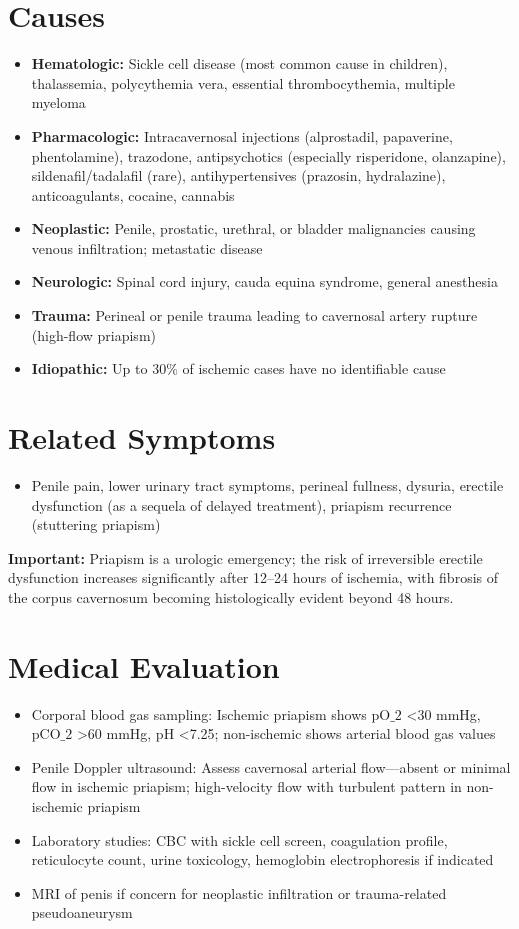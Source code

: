 \section*{Causes}
\begin{itemize}
  \item \textbf{Hematologic:} Sickle cell disease (most common cause in children), thalassemia, polycythemia vera, essential thrombocythemia, multiple myeloma
  \item \textbf{Pharmacologic:} Intracavernosal injections (alprostadil, papaverine, phentolamine), trazodone, antipsychotics (especially risperidone, olanzapine), sildenafil/tadalafil (rare), antihypertensives (prazosin, hydralazine), anticoagulants, cocaine, cannabis
  \item \textbf{Neoplastic:} Penile, prostatic, urethral, or bladder malignancies causing venous infiltration; metastatic disease
  \item \textbf{Neurologic:} Spinal cord injury, cauda equina syndrome, general anesthesia
  \item \textbf{Trauma:} Perineal or penile trauma leading to cavernosal artery rupture (high-flow priapism)
  \item \textbf{Idiopathic:} Up to 30\% of ischemic cases have no identifiable cause
\end{itemize}

\section*{Related Symptoms}
\begin{itemize}
  \item Penile pain, lower urinary tract symptoms, perineal fullness, dysuria, erectile dysfunction (as a sequela of delayed treatment), priapism recurrence (stuttering priapism)
\end{itemize}
\textbf{Important:} Priapism is a urologic emergency; the risk of irreversible erectile dysfunction increases significantly after 12--24 hours of ischemia, with fibrosis of the corpus cavernosum becoming histologically evident beyond 48 hours.

\section*{Medical Evaluation}
\begin{itemize}
  \item Corporal blood gas sampling: Ischemic priapism shows pO\(\_2\) \textless{}30 mmHg, pCO\(\_2\) \textgreater{}60 mmHg, pH \textless{}7.25; non-ischemic shows arterial blood gas values
  \item Penile Doppler ultrasound: Assess cavernosal arterial flow---absent or minimal flow in ischemic priapism; high-velocity flow with turbulent pattern in non-ischemic priapism
  \item Laboratory studies: CBC with sickle cell screen, coagulation profile, reticulocyte count, urine toxicology, hemoglobin electrophoresis if indicated
  \item MRI of penis if concern for neoplastic infiltration or trauma-related pseudoaneurysm
\end{itemize}

